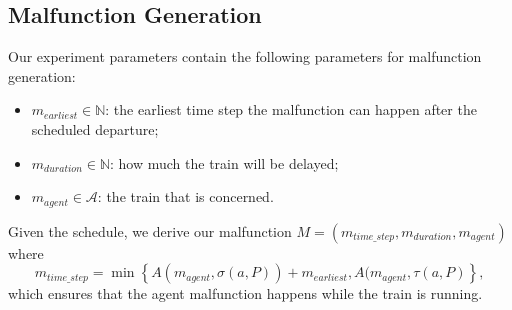 \documentclass{article}
\begin{document}
\subsection{Malfunction Generation}\label{subsubsec:malfunctiongeneration}

Our experiment parameters contain the following parameters for malfunction generation:
\begin{itemize}
    \item $m_{earliest} \in \mathbb{N}$: the earliest time step the malfunction can happen after the scheduled departure;
    \item $m_{duration} \in \mathbb{N}$: how much the train will be delayed;
    \item $m_{agent} \in \mathcal{A}$: the train that is concerned.
\end{itemize}

Given the schedule, we derive our malfunction $M=(m_{time\_step},m_{duration},m_{agent})$ where
\begin{equation*}
m_{time\_step} = \min \left\{  A(m_{agent},\sigma(a, P)) + m_{earliest},  A(m_{agent},\tau(a,P) \right\},
\end{equation*}
which ensures that the agent malfunction happens while the train is running.




\end{document}
